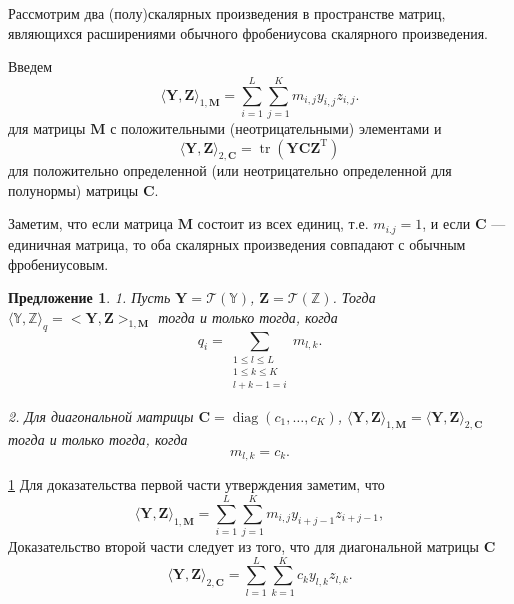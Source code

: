 \documentclass[12pt,a4paper,fleqn,leqno]{article}
\DeclareMathOperator{\tr}{tr}
\newtheorem{proposition}{Предложение}
\newcommand{\rmT}{\mathrm{T}}
\newcommand{\tsY}{\mathbb{Y}}
\newcommand{\tsZ}{\mathbb{Z}}
\newcommand{\bfC}{\mathbf{C}}
\newcommand{\bfM}{\mathbf{M}}
\newcommand{\bfY}{\mathbf{Y}}
\newcommand{\bfZ}{\mathbf{Z}}
\newcommand{\calT}{\mathcal{T}}
\newcommand{\diag}{\mathop{\mathrm{diag}}}
\begin{document}
Рассмотрим два (полу)скалярных произведения в пространстве матриц, являющихся расширениями
обычного фробениусова скалярного произведения.

Введем
\begin{equation}
\label{eq:norm1M}
    \langle\bfY,\bfZ\rangle_{1,\bfM} = \sum_{i = 1}^L \sum_{j=1}^K m_{i,j} y_{i,j} z_{i,j}.
\end{equation}
для матрицы $\bfM$ с положительными (неотрицательными) элементами и
\begin{equation}
\label{eq:norm2S}
    \langle\bfY,\bfZ\rangle_{2,\bfC} = \tr(\bfY \bfC \bfZ^\rmT)
\end{equation}
для положительно определенной (или неотрицательно определенной для полунормы) матрицы $\bfC$.

Заметим, что если матрица $\bfM$ состоит из всех единиц, т.е. $m_{i.j}=1$,
и если $\bfC$ --- единичная матрица, то оба скалярных произведения совпадают
с обычным фробениусовым.

\begin{proposition}
\label{prop:equiv_tasks}
1. Пусть $\bfY = \calT(\tsY)$,  $\bfZ = \calT(\tsZ)$. Тогда $\langle\tsY,\tsZ\rangle_q= <\bfY,\bfZ>_{1,\bfM}$ тогда и только тогда, когда
\begin{equation}\label{qi_mi}
q_i = \sum_{\substack{1 \le l \le L \\ 1 \le k \le K \\ l+k-1=i}} m_{l,k}.
\end{equation}

2. Для диагональной матрицы $\bfC=\diag(c_1,\ldots,c_K)$, $\langle\bfY,\bfZ\rangle_{1,\bfM}= \langle\bfY,\bfZ\rangle_{2,\bfC}$ тогда и только тогда, когда
\begin{equation}\label{sk_mlk}
m_{l,k}=c_k.
\end{equation}
\end{proposition}
\begin{proof5}{\ref{prop:equiv_tasks}}
Для доказательства первой части утверждения заметим, что
\begin{equation*}
\langle \bfY, \bfZ \rangle_{1,\bfM} = \sum_{i = 1}^L \sum_{j = 1}^K m_{i,j} y_{i + j - 1} z_{i + j - 1},
\end{equation*}
Доказательство второй части следует из того, что для диагональной матрицы $\bfC$
\begin{equation*}
\langle \bfY, \bfZ \rangle_{2,\bfC} = \sum_{l=1}^L \sum_{k=1}^K c_k y_{l,k} z_{l, k}.
\end{equation*}
\end{proof5}
\end{document}
